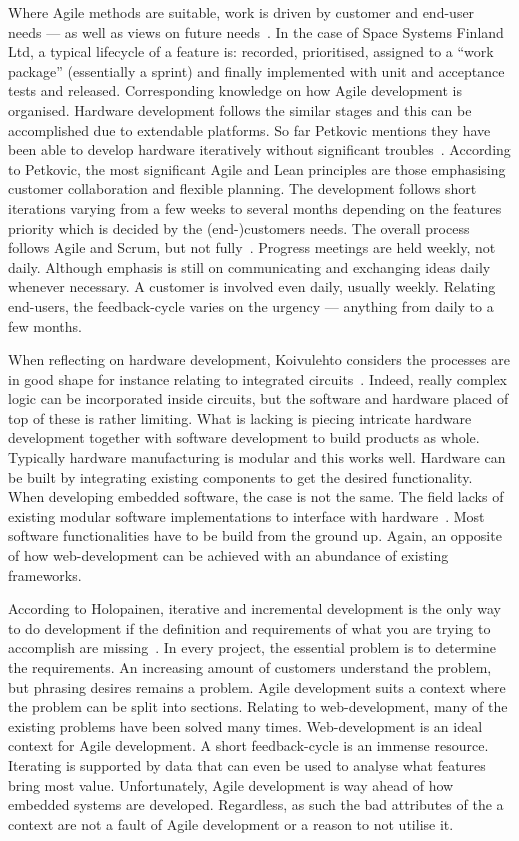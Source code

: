\documentclass[english]{tktltiki2}
\begin{document}
Where Agile methods are suitable, work is driven by customer and end-user needs — as well as views on future needs~\cite{Pet15}. In the case of Space Systems Finland Ltd, a typical lifecycle of a feature is: recorded, prioritised, assigned to a “work package” (essentially a sprint) and finally implemented with unit and acceptance tests and released. Corresponding knowledge on how Agile development is organised. Hardware development follows the similar stages and this can be accomplished due to extendable platforms. So far Petkovic mentions they have been able to develop hardware iteratively without significant troubles~\cite{Pet15}. According to Petkovic, the most significant Agile and Lean principles are those emphasising customer collaboration and flexible planning. The development follows short iterations varying from a few weeks to several months depending on the features priority which is decided by the (end-)customers needs. The overall process follows Agile and Scrum, but not fully~\cite{Pet15}. Progress meetings are held weekly, not daily. Although emphasis is still on communicating and exchanging ideas daily whenever necessary. A customer is involved even daily, usually weekly. Relating end-users, the feedback-cycle varies on the urgency — anything from daily to a few months.

When reflecting on hardware development, Koivulehto considers the processes are in good shape for instance relating to integrated circuits~\cite{Hol15a}. Indeed, really complex logic can be incorporated inside circuits, but the software and hardware placed of top of these is rather limiting. What is lacking is piecing intricate hardware development together with software development to build products as whole. Typically hardware manufacturing is modular and this works well. Hardware can be built by integrating existing components to get the desired functionality. When developing embedded software, the case is not the same. The field lacks of existing modular software implementations to interface with hardware~\cite{Hol15a}. Most software functionalities have to be build from the ground up. Again, an opposite of how web-development can be achieved with an abundance of existing frameworks.

According to Holopainen, iterative and incremental development is the only way to do development if the definition and requirements of what you are trying to accomplish are missing~\cite{Hol15a}. In every project, the essential problem is to determine the requirements. An increasing amount of customers understand the problem, but phrasing desires remains a problem. Agile development suits a context where the problem can be split into sections. Relating to web-development, many of the existing problems have been solved many times. Web-development is an ideal context for Agile development. A short feedback-cycle is an immense resource. Iterating is supported by data that can even be used to analyse what features bring most value. Unfortunately, Agile development is way ahead of how embedded systems are developed. Regardless, as such the bad attributes of the a context are not a fault of Agile development or a reason to not utilise it.
\end{document}

